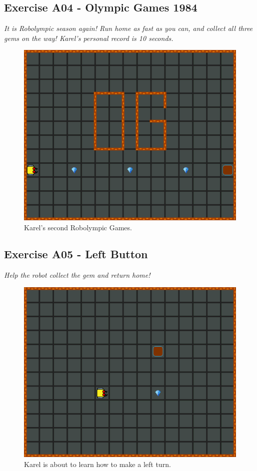 \subsection{Exercise A04 - Olympic Games 1984}

{\em It is Robolympic season again! Run home as fast as you can, 
and collect all three gems on the way! Karel's personal record is 10 seconds.}


\begin{figure}[!ht]
\begin{center}
\includegraphics[height=0.4\textwidth]{imgk/a04.png}
\end{center}
\vspace{-4mm}
\caption{Karel's second Robolympic Games.}
\label{fig:a04}
\vspace{-1cm}
\end{figure}
\noindent


\subsection{Exercise A05 - Left Button}

{\em Help the robot collect the gem and return home!}

\begin{figure}[!ht]
\begin{center}
\includegraphics[height=0.4\textwidth]{imgk/a05.png}
\end{center}
\vspace{-4mm}
\caption{Karel is about to learn how to make a left turn.}
\label{fig:a05}
\vspace{-1cm}
\end{figure}
\noindent


